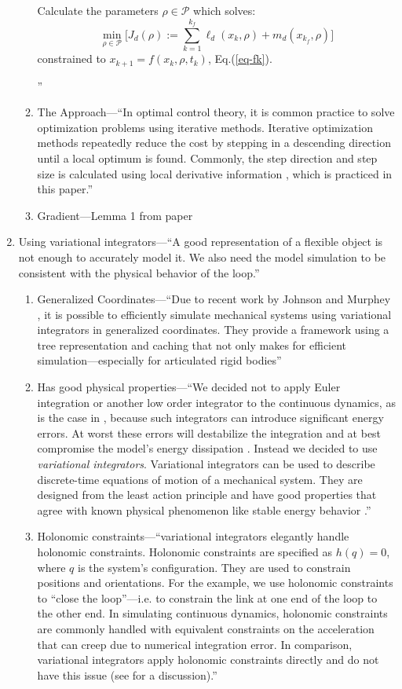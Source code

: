 \documentclass[runningheads,a4paper]{llncs}
\begin{document}
\begin{enumerate}
\begin{enumerate}
\begin{problem}
Calculate the parameters $\rho\in\mathcal{P}$ which solves:
\[
\min_{\rho\in\mathcal{P}} \Big[J_d(\rho):=\sum_{k=1}^{k_f}\ell_d(x_k,\rho) + m_d(x_{k_f},\rho)\Big]
\]
constrained to $x_{k+1} = f(x_k,\rho,t_k)$, Eq.(\ref{eq-fk}).
\label{prob-disc}
\end{problem}
''
\item The Approach---``In optimal control theory, it is common practice to solve optimization problems using iterative methods.  Iterative optimization methods repeatedly reduce the cost by stepping in a descending direction until a local optimum is found.  Commonly, the step direction and step size is calculated using local derivative information \cite{armijo}\cite{kelley}, which is practiced in this paper.''
\item Gradient---Lemma 1 from paper
\end{enumerate}
\item Using variational integrators---``A good representation of a flexible object is not enough to accurately model it.  We also need the model simulation to be consistent with the physical behavior of the loop.''
\begin{enumerate}
  \item Generalized Coordinates---``Due to recent work by Johnson and Murphey \cite{johnson_murphey_scalable} \cite{johnson_murphey_linearization}, it is possible to efficiently simulate mechanical systems using variational integrators in generalized coordinates. They provide a framework using a tree representation and caching that not only makes for efficient simulation---especially for articulated rigid bodies''
  \item Has good physical properties---``We decided not to apply Euler integration or another low order integrator to the continuous dynamics, as is the case in \cite{sahari_etal}, because such integrators can introduce significant energy errors.  At worst these errors will destabilize the integration and at best compromise the model's energy dissipation \cite{johnson_murphey_scalable}. Instead we decided to use \emph{variational integrators}.  Variational integrators can be used to describe discrete-time equations of motion of a mechanical system.  They are designed from the least action principle and have good properties that agree with known physical phenomenon like stable energy behavior \cite{pekarek_murphey}.''
  \item Holonomic constraints---``variational integrators elegantly handle holonomic constraints.  Holonomic constraints are specified as $h(q) = 0$, where $q$ is the system's configuration.  They are used to constrain positions and orientations.  For the example, we use holonomic constraints to ``close the loop''---i.e. to constrain the link at one end of the loop to the other end.  In simulating continuous dynamics, holonomic constraints are commonly handled with equivalent constraints on the acceleration that can creep due to numerical integration error.  In comparison, variational integrators apply holonomic constraints directly and do not have this issue (see \cite{johnson_murphey_scalable} for a discussion).''

\end{enumerate}
\end{enumerate}
\end{document}
